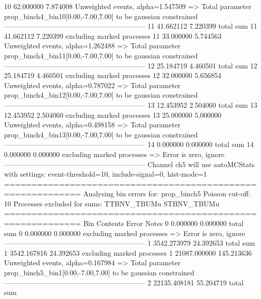 10         62.000000       7.874008        Unweighted events, alpha=1.547509
  => Total parameter prop_binch4_bin10[0.00,-7.00,7.00] to be gaussian constrained
------------------------------------------------------------
11         41.662112       7.220399        total sum                     
11         41.662112       7.220399        excluding marked processes    
11         33.000000       5.744563        Unweighted events, alpha=1.262488
  => Total parameter prop_binch4_bin11[0.00,-7.00,7.00] to be gaussian constrained
------------------------------------------------------------
12         25.184719       4.460501        total sum                     
12         25.184719       4.460501        excluding marked processes    
12         32.000000       5.656854        Unweighted events, alpha=0.787022
  => Total parameter prop_binch4_bin12[0.00,-7.00,7.00] to be gaussian constrained
------------------------------------------------------------
13         12.453952       2.504060        total sum                     
13         12.453952       2.504060        excluding marked processes    
13         25.000000       5.000000        Unweighted events, alpha=0.498158
  => Total parameter prop_binch4_bin13[0.00,-7.00,7.00] to be gaussian constrained
------------------------------------------------------------
14         0.000000        0.000000        total sum                     
14         0.000000        0.000000        excluding marked processes    
  => Error is zero, ignore      
------------------------------------------------------------
Channel ch5 will use autoMCStats with settings: event-threshold=10, include-signal=0, hist-mode=1
============================================================
Analysing bin errors for: prop_binch5
Poisson cut-off: 10
Processes excluded for sums: TTBNV_TBUMu STBNV_TBUMu
============================================================
Bin        Contents        Error           Notes                         
0          0.000000        0.000000        total sum                     
0          0.000000        0.000000        excluding marked processes    
  => Error is zero, ignore      
------------------------------------------------------------
1          3542.273979     24.392653       total sum                     
1          3542.167816     24.392653       excluding marked processes    
1          21087.000000    145.213636      Unweighted events, alpha=0.167984
  => Total parameter prop_binch5_bin1[0.00,-7.00,7.00] to be gaussian constrained
------------------------------------------------------------
2          22135.408181    55.204719       total sum                     
